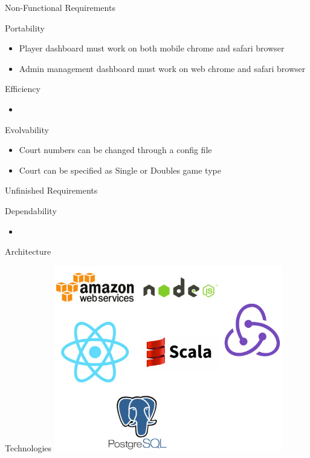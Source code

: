 \documentclass{beamer}
\begin{document}
\begin{frame}
\Huge Non-Functional Requirements
\end{frame}

\begin{frame}{Portability}
\begin{itemize}
\item Player dashboard must work on both mobile chrome and safari browser
\item Admin management dashboard must work on web chrome and safari browser
\end{itemize}
\end{frame}

\begin{frame}{Efficiency}
\begin{itemize}
\item
\end{itemize}
\end{frame}

\begin{frame}{Evolvability}
\begin{itemize}
\item Court numbers can be changed through a config file
\item Court can be specified as Single or Doubles game type
\end{itemize}
\end{frame}

\begin{frame}
\Huge Unfinished Requirements
\end{frame}

\begin{frame}{Dependability}
\begin{itemize}
\item
\end{itemize}
\end{frame}

\begin{frame}
\Huge Architecture
\end{frame}

\begin{frame}{Technologies}
\includegraphics[width=10cm]{logos.jpg}
\end{frame}
\end{document}
